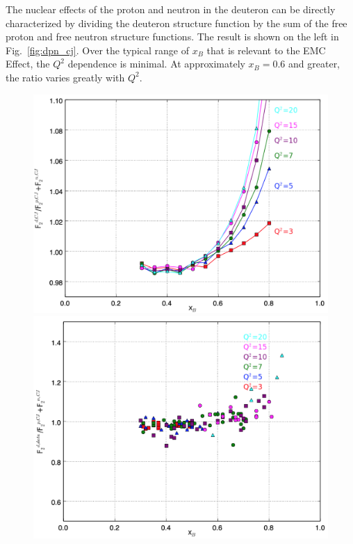 \documentclass[oneside]{article}
\begin{document}
The nuclear effects of the proton and neutron in the deuteron can be directly characterized by dividing the deuteron structure function by the sum of the free proton and free neutron structure functions. The result is shown on the left in Fig.~\ref{fig:dpn_cj}. Over the typical range of $x_B$ that is relevant to the EMC Effect, the $Q^2$ dependence is minimal. At approximately $x_B=0.6$ and greater, the ratio varies greatly with $Q^2$.  
 
 \begin{figure}
\begin{minipage}{0.5\textwidth}
 \includegraphics[width=\textwidth]{plots/dpn_allCJ.png}
\end{minipage}\hfill\begin{minipage}{0.5\textwidth}
 \includegraphics[width=\textwidth]{plots/deuterium_q2.png}

\end{minipage}
\end{figure}
\end{document}
